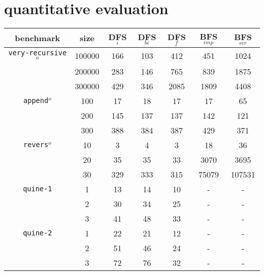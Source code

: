 \documentclass[format=acmlarge, review=false, authordraft=false]{acmart}
\newcommand{\veryrecursiveo}{\texttt{very-recursive$^o$}}
\newcommand{\appendo}{\texttt{append$^o$}}
\newcommand{\reverso}{\texttt{revers$^o$}}
\newcommand{\DFSi }[0]{DFS$_{i}$}
\newcommand{\DFSf }[0]{DFS$_{f}$}
\newcommand{\DFSbi}[0]{DFS$_{bi}$}
\newcommand{\BFSser}[0]{BFS$_{ser}$}
\newcommand{\BFSimp}[0]{BFS$_{imp}$}
\begin{document}
\section{quantitative evaluation}
\label{sec:quan}

\begin{table}
	\begin{tabular}{|c|c|c|c|c|c|c|}
		\hline 
	benchmark & size & \DFSi & \DFSbi & \DFSf & \BFSimp{} & \BFSser{} \\
		\hline
		\veryrecursiveo & 100000 & 166 & 103 & 412 &   451 &   1024 \\
	    				& 200000 & 283 & 146 & 765 &   839 &   1875 \\
						& 300000 & 429 & 346 &2085 &  1809 &   4408 \\
		\hline  
		\appendo        & 	 100 &  17 &  18 &  17 &    17 &     65 \\
		         	  	& 	 200 & 145 & 137 & 137 &   142 &    121 \\
          		      	&	 300 & 388 & 384 & 387 &   429 &    371 \\
		\hline 
		\reverso		& 	  10 &   3 &   4 &   3 &    18 &     36 \\
						& 	  20 &  35 &  35 &  33 &  3070 &   3695 \\
						& 	  30 & 329 & 333 & 315 & 75079 & 107531 \\
		\hline
	\texttt{quine-1}	& 1 & 13 & 14 & 10 & - & - \\
						& 2 & 30 & 34 & 25 & - & - \\
						& 3 & 41 & 48 & 33 & - & - \\
		\hline
	\texttt{quine-2}	& 1 & 22 & 21 & 12 & - & - \\
						& 2 & 51 & 46 & 24 & - & - \\
						& 3 & 72 & 76 & 32 & - & - \\
		\hline

\end{tabular}
\end{table}
\end{document}
